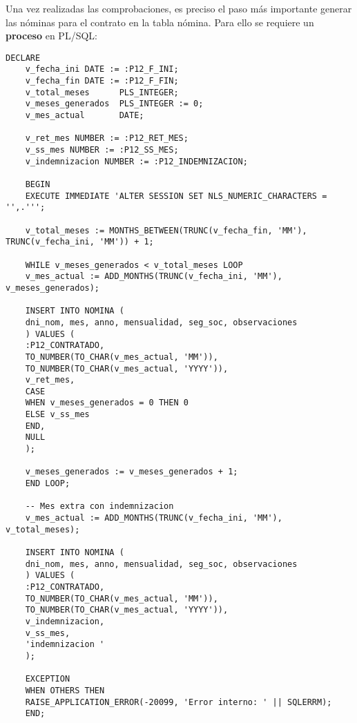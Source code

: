 Una vez realizadas las comprobaciones, es preciso el paso más importante generar las nóminas para el contrato en la tabla nómina. Para ello se requiere un \textbf{proceso} en \acrshort{PL/SQL}:
\begin{lstlisting}[language=PLSQL, caption={Proceso que genera las nóminas relativas a un nuevo contrato}]
	DECLARE
	v_fecha_ini DATE := :P12_F_INI;
	v_fecha_fin DATE := :P12_F_FIN;
	v_total_meses      PLS_INTEGER;
	v_meses_generados  PLS_INTEGER := 0;
	v_mes_actual       DATE;
	
	v_ret_mes NUMBER := :P12_RET_MES;
	v_ss_mes NUMBER := :P12_SS_MES;
	v_indemnizacion NUMBER := :P12_INDEMNIZACION;
	
	BEGIN
	EXECUTE IMMEDIATE 'ALTER SESSION SET NLS_NUMERIC_CHARACTERS = '',.''';
	
	v_total_meses := MONTHS_BETWEEN(TRUNC(v_fecha_fin, 'MM'), TRUNC(v_fecha_ini, 'MM')) + 1;
	
	WHILE v_meses_generados < v_total_meses LOOP
	v_mes_actual := ADD_MONTHS(TRUNC(v_fecha_ini, 'MM'), v_meses_generados);
	
	INSERT INTO NOMINA (
	dni_nom, mes, anno, mensualidad, seg_soc, observaciones
	) VALUES (
	:P12_CONTRATADO,
	TO_NUMBER(TO_CHAR(v_mes_actual, 'MM')),
	TO_NUMBER(TO_CHAR(v_mes_actual, 'YYYY')),
	v_ret_mes,
	CASE
	WHEN v_meses_generados = 0 THEN 0
	ELSE v_ss_mes
	END,
	NULL
	);
	
	v_meses_generados := v_meses_generados + 1;
	END LOOP;
	
	-- Mes extra con indemnizacion
	v_mes_actual := ADD_MONTHS(TRUNC(v_fecha_ini, 'MM'), v_total_meses);
	
	INSERT INTO NOMINA (
	dni_nom, mes, anno, mensualidad, seg_soc, observaciones
	) VALUES (
	:P12_CONTRATADO,
	TO_NUMBER(TO_CHAR(v_mes_actual, 'MM')),
	TO_NUMBER(TO_CHAR(v_mes_actual, 'YYYY')),
	v_indemnizacion,
	v_ss_mes,
	'indemnizacion '
	);
	
	EXCEPTION
	WHEN OTHERS THEN
	RAISE_APPLICATION_ERROR(-20099, 'Error interno: ' || SQLERRM);
	END;
\end{lstlisting}

